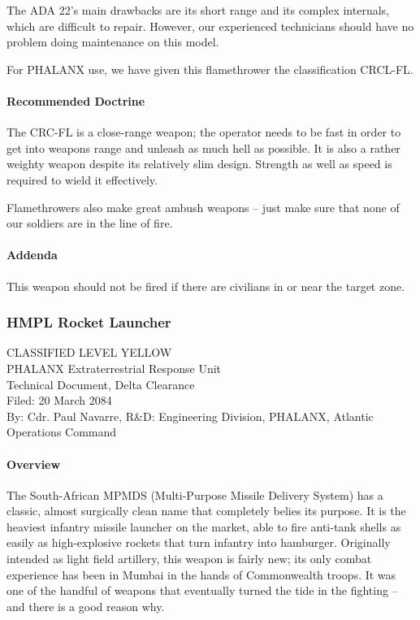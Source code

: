 The ADA 22's main drawbacks are its short range and its complex internals, which are difficult to repair. However, our experienced technicians should have no problem doing maintenance on this model.

For PHALANX use, we have given this flamethrower the classification CRCL-FL.
\paragraph*{Recommended Doctrine}
The CRC-FL is a close-range weapon; the operator needs to be fast in order to get into weapons range and unleash as much hell as possible. It is also a rather weighty weapon despite its relatively slim design. Strength as well as speed is required to wield it effectively.

Flamethrowers also make great ambush weapons -- just make sure that none of our soldiers are in the line of fire.
\paragraph*{Addenda}
This weapon should not be fired if there are civilians in or near the target zone.
\subsubsection*{HMPL Rocket Launcher}
CLASSIFIED LEVEL YELLOW\\
PHALANX Extraterrestrial Response Unit\\
Technical Document, Delta Clearance\\
Filed: 20 March 2084\\
By: Cdr. Paul Navarre, R&D: Engineering Division, PHALANX, Atlantic Operations Command\\
\paragraph*{Overview}
The South-African MPMDS (Multi-Purpose Missile Delivery System) has a classic, almost surgically clean name that completely belies its purpose. It is the heaviest infantry missile launcher on the market, able to fire anti-tank shells as easily as high-explosive rockets that turn infantry into hamburger. Originally intended as light field artillery, this weapon is fairly new; its only combat experience has been in Mumbai in the hands of Commonwealth troops. It was one of the handful of weapons that eventually turned the tide in the fighting -- and there is a good reason why.


